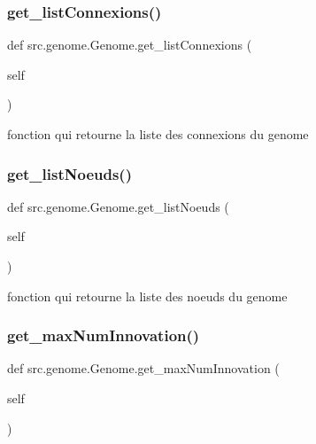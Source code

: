\subsubsection{\texorpdfstring{get\+\_\+list\+Connexions()}{get\_listConnexions()}}
{\footnotesize\ttfamily def src.\+genome.\+Genome.\+get\+\_\+list\+Connexions (\begin{DoxyParamCaption}\item[{}]{self }\end{DoxyParamCaption})}



fonction qui retourne la liste des connexions du genome 

\mbox{\label{classsrc_1_1genome_1_1_genome_a7b991ac9dbccefc376cd37752a14bcbc}} 
\subsubsection{\texorpdfstring{get\+\_\+list\+Noeuds()}{get\_listNoeuds()}}
{\footnotesize\ttfamily def src.\+genome.\+Genome.\+get\+\_\+list\+Noeuds (\begin{DoxyParamCaption}\item[{}]{self }\end{DoxyParamCaption})}



fonction qui retourne la liste des noeuds du genome 

\mbox{\label{classsrc_1_1genome_1_1_genome_aa63fcd0ecdbe1d09b03923345ccc2905}} 
\subsubsection{\texorpdfstring{get\+\_\+max\+Num\+Innovation()}{get\_maxNumInnovation()}}
{\footnotesize\ttfamily def src.\+genome.\+Genome.\+get\+\_\+max\+Num\+Innovation (\begin{DoxyParamCaption}\item[{}]{self }\end{DoxyParamCaption})}



